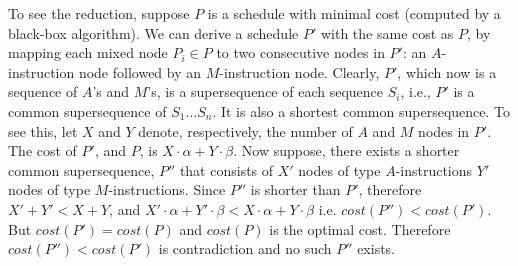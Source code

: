 To see the reduction, suppose $P$ is a schedule with minimal cost (computed by a black-box algorithm). We can derive a schedule $P'$ with the same cost as $P$, by mapping each mixed node $P_i \in P$ to two consecutive nodes in $P'$: an $A$-instruction node followed by an $M$-instruction node. Clearly, $P'$, which now is a sequence of $A$'s and $M$'s, is a supersequence of each sequence $S_i$, i.e., $P'$ is a common supersequence of $S_1 \dots S_n$. It is also a shortest common supersequence. To see this, let $X$ and $Y$ denote, respectively, the number of $A$ and $M$ nodes in $P'$. The cost of $P'$, and $P$, is $X \cdot \alpha + Y \cdot \beta$. Now suppose, there exists a shorter common supersequence, $P''$ that consists of $X'$ nodes of type $A$-instructions $Y'$ nodes of type $M$-instructions. Since $P''$ is shorter than $P'$, therefore $X' + Y' < X + Y$, and $X' \cdot \alpha + Y' \cdot \beta < X \cdot \alpha + Y \cdot \beta$ i.e. $\mathit{cost}(P'') < \mathit{cost}(P')$. But $\mathit{cost}(P') = \mathit{cost}(P)$ and $\mathit{cost}(P)$ is the optimal cost.  Therefore $\mathit{cost}(P'') < \mathit{cost}(P')$ is contradiction and no such $P''$ exists.

